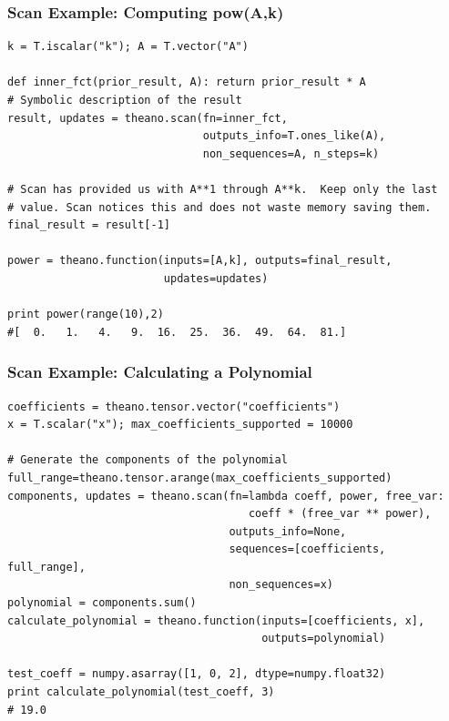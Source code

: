 \documentclass[a4paper,9pt]{beamer}
\begin{document}
\begin{frame}[fragile]
\frametitle{Scan Example: Computing pow(A,k)}
\begin{Verbatim}
k = T.iscalar("k"); A = T.vector("A")

def inner_fct(prior_result, A): return prior_result * A
# Symbolic description of the result
result, updates = theano.scan(fn=inner_fct,
                              outputs_info=T.ones_like(A),
                              non_sequences=A, n_steps=k)

# Scan has provided us with A**1 through A**k.  Keep only the last
# value. Scan notices this and does not waste memory saving them.
final_result = result[-1]

power = theano.function(inputs=[A,k], outputs=final_result,
                        updates=updates)

print power(range(10),2)
#[  0.   1.   4.   9.  16.  25.  36.  49.  64.  81.]
\end{Verbatim}
\end{frame}

\begin{frame}[fragile]
\frametitle{Scan Example: Calculating a Polynomial}
\begin{Verbatim}
coefficients = theano.tensor.vector("coefficients")
x = T.scalar("x"); max_coefficients_supported = 10000

# Generate the components of the polynomial
full_range=theano.tensor.arange(max_coefficients_supported)
components, updates = theano.scan(fn=lambda coeff, power, free_var: 
                                     coeff * (free_var ** power),
                                  outputs_info=None,
                                  sequences=[coefficients, full_range],
                                  non_sequences=x)
polynomial = components.sum()
calculate_polynomial = theano.function(inputs=[coefficients, x],
                                       outputs=polynomial)

test_coeff = numpy.asarray([1, 0, 2], dtype=numpy.float32)
print calculate_polynomial(test_coeff, 3)
# 19.0
\end{Verbatim}
\end{frame}
\end{document}
